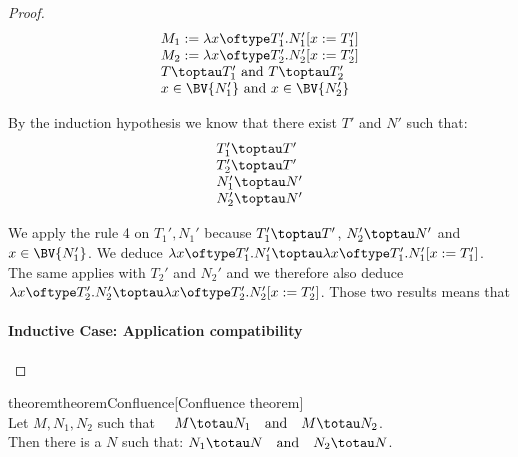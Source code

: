 \begin{proof}
    \[
    \begin{array}{l}
        M_1:=\lambda x \oftype T_1'.N_1'[x := T_1'] \\
        M_2:=\lambda x \oftype T_2'.N_2'[x := T_2'] \\
        T \toptau T_1' \text{ and } T \toptau T_2' \\
        x \in \BV{N_1'} \text{ and } x \in \BV{N_2'}
    \end{array}
    \]
    
    By the induction hypothesis we know that there exist $T'$ and $N'$ such that:
    \[
    \begin{array}{l}
        T_1' \toptau T' \\
        T_2' \toptau T' \\
        N_1' \toptau N' \\
        N_2' \toptau N'
    \end{array}
    \]
    
    We apply the rule 4 on $T_1', N_1'$ because $T_1' \toptau T'$, $N_2' \toptau N'$ and $x \in \BV{N_1'}$. We deduce $\lambda x \oftype T_1'.N_1' \toptau \lambda x \oftype T_1'.N_1'[x := T_1']$. The same applies with $T_2'$ and $N_2'$ and we therefore also deduce $\lambda x \oftype T_2'.N_2' \toptau \lambda x \oftype T_2'.N_2'[x := T_2']$. Those two results means that

\paragraph{Inductive Case: Application compatibility}
    
\end{proof}

\begin{reusable}{theorem}{theoremConfluence}[Confluence theorem]\\
Let $M, N_1, N_2$ such that $\quad M \totau N_{1} \quad\text{and}\quad M \totau N_{2}$.\\
Then there is a $N$ such that: $N_{1} \totau N \quad\text{and}\quad N_{2} \totau N$.
\end{reusable}
